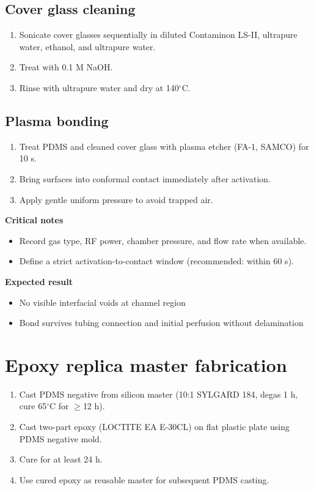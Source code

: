 \subsection{Cover glass cleaning}
\begin{enumerate}
  \item Sonicate cover glasses sequentially in diluted Contaminon LS-II, ultrapure water, ethanol, and ultrapure water.
  \item Treat with 0.1 M NaOH.
  \item Rinse with ultrapure water and dry at 140$^{\circ}$C.
\end{enumerate}

\subsection{Plasma bonding}
\begin{enumerate}
  \item Treat PDMS and cleaned cover glass with plasma etcher (FA-1, SAMCO) for 10 s.
  \item Bring surfaces into conformal contact immediately after activation.
  \item Apply gentle uniform pressure to avoid trapped air.
\end{enumerate}

\textbf{Critical notes}
\begin{itemize}
  \item Record gas type, RF power, chamber pressure, and flow rate when available.
  \item Define a strict activation-to-contact window (recommended: within 60 s).
\end{itemize}

\textbf{Expected result}
\begin{itemize}
  \item No visible interfacial voids at channel region
  \item Bond survives tubing connection and initial perfusion without delamination
\end{itemize}

\section{Epoxy replica master fabrication}
\begin{enumerate}
  \item Cast PDMS negative from silicon master (10:1 SYLGARD 184, degas 1 h, cure 65$^{\circ}$C for $\geq$12 h).
  \item Cast two-part epoxy (LOCTITE EA E-30CL) on flat plastic plate using PDMS negative mold.
  \item Cure for at least 24 h.
  \item Use cured epoxy as reusable master for subsequent PDMS casting.
\end{enumerate}

